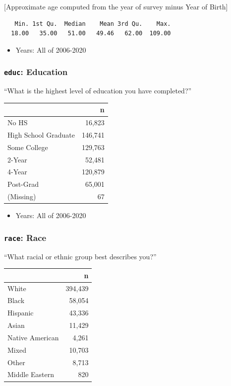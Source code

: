 \documentclass[10pt,article,oneside]{memoir}
\theoremstyle{definition}
\begin{document}
{[}Approximate age computed from the year of survey minus Year of
Birth{]}

\begin{verbatim}
   Min. 1st Qu.  Median    Mean 3rd Qu.    Max. 
  18.00   35.00   51.00   49.46   62.00  109.00 
\end{verbatim}

\begin{itemize}
\tightlist
\item
  Years: All of 2006-2020
\end{itemize}

\hypertarget{educ-education}{%
\subsubsection{\texorpdfstring{\texttt{educ}:
Education}{educ: Education}}\label{educ-education}}

``What is the highest level of education you have completed?''

\begin{table}[H]
\centering
\begin{tabular}[t]{lr}
\toprule
 & n\\
\midrule
No HS & 16,823\\
High School Graduate & 146,741\\
Some College & 129,763\\
2-Year & 52,481\\
4-Year & 120,879\\
Post-Grad & 65,001\\
(Missing) & 67\\
\bottomrule
\end{tabular}
\end{table}

\begin{itemize}
\tightlist
\item
  Years: All of 2006-2020
\end{itemize}

\hypertarget{race-race}{%
\subsubsection{\texorpdfstring{\texttt{race}:
Race}{race: Race}}\label{race-race}}

``What racial or ethnic group best describes you?''

\begin{table}[H]
\centering
\begin{tabular}[t]{lr}
\toprule
 & n\\
\midrule
White & 394,439\\
Black & 58,054\\
Hispanic & 43,336\\
Asian & 11,429\\
Native American & 4,261\\
Mixed & 10,703\\
Other & 8,713\\
Middle Eastern & 820\\
\bottomrule
\end{tabular}
\end{table}
\end{document}
